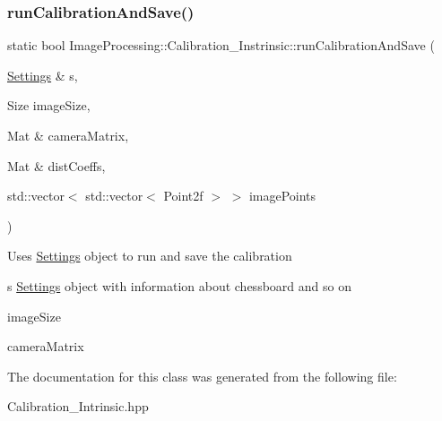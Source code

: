 \subsubsection{\texorpdfstring{run\+Calibration\+And\+Save()}{runCalibrationAndSave()}}
{\footnotesize\ttfamily static bool Image\+Processing\+::\+Calibration\+\_\+\+Instrinsic\+::run\+Calibration\+And\+Save (\begin{DoxyParamCaption}\item[{\mbox{\hyperlink{class_settings}{Settings}} \&}]{s,  }\item[{Size}]{image\+Size,  }\item[{Mat \&}]{camera\+Matrix,  }\item[{Mat \&}]{dist\+Coeffs,  }\item[{std\+::vector$<$ std\+::vector$<$ Point2f $>$ $>$}]{image\+Points }\end{DoxyParamCaption})\hspace{0.3cm}{\ttfamily [static]}}

Uses \mbox{\hyperlink{class_settings}{Settings}} object to run and save the calibration \begin{DoxyItemize}
\item s \mbox{\hyperlink{class_settings}{Settings}} object with information about chessboard and so on \item image\+Size \item camera\+Matrix \end{DoxyItemize}


The documentation for this class was generated from the following file\+:\begin{DoxyCompactItemize}
\item 
Calibration\+\_\+\+Intrinsic.\+hpp\end{DoxyCompactItemize}
